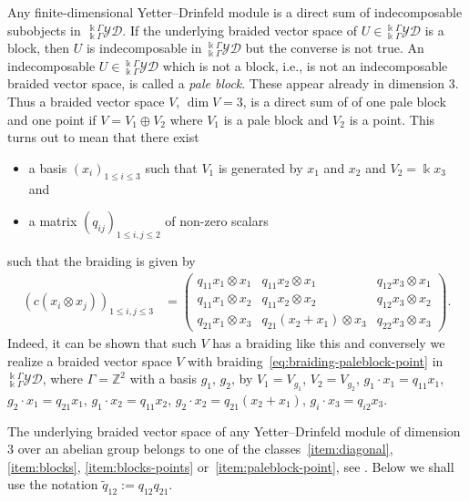 \documentclass[10pt,a4paper]{amsart}
\numberwithin{equation}{section}
\newcommand{\Z}{{\mathbb Z}}
\newcommand{\yd}[1]{{}_{#1}^{#1}\mathcal{YD}}
\begin{document}
Any finite-dimensional Yetter--Drinfeld module is a direct sum of indecomposable subobjects in~$\yd{\Bbbk\Gamma}$.
If the underlying braided vector space of $U\in\yd{\Bbbk\Gamma}$ is a block, then $U$ is indecomposable in $\yd{\Bbbk\Gamma}$ but the converse is not true. An indecomposable $U\in\yd{\Bbbk\Gamma}$ which is not a block, i.e., is not an indecomposable braided vector space, is called a \emph{pale block}. These appear already in dimension 3.
Thus a braided vector space $V$, $\dim V = 3$, is a direct sum of of one pale block and one point if
$V = V_1 \oplus V_2$ where $V_1$ is a pale block and $V_2 $ is a point. This turns out to mean that there exist
\begin{itemize}%
\itemsep=0pt
\item a basis $(x_i)_{1\le i \le 3}$ such that $V_1$ is generated by $x_1$ and $x_2$ and $V_2 = \Bbbk x_3$ and
\item a matrix $(q_{ij})_{1 \le i,j \le 2}$ of non-zero scalars
\end{itemize}
such that the braiding is given by
\begin{align}\label{eq:braiding-paleblock-point}
(c(x_i \otimes x_j))_{1 \le i,j \le 3} &=
\begin{pmatrix}
q_{11} x_1 \otimes x_1& q_{11} x_2 \otimes x_1& q_{12} x_3 \otimes x_1
\\
q_{11} x_1 \otimes x_2 & q_{11} x_2 \otimes x_2& q_{12} x_3 \otimes x_2
\\
q_{21} x_1 \otimes x_3 & q_{21}(x_2 + x_1) \otimes x_3& q_{22} x_3 \otimes x_3
\end{pmatrix}\!.
\end{align}
Indeed, it can be shown that such $V$ has a braiding like this \cite[Sections~4.1 and~8.1]{AAH-triang} and conversely
we realize a braided vector space $V$ with braiding~\eqref{eq:braiding-paleblock-point}
in $\yd{\Bbbk\Gamma}$, where $\Gamma = \Z^2$ with a basis $g_1$, $g_2$,
by $V_1 = V_{g_1}$, $V_2 = V_{g_2}$, $g_1\cdot x_1 = q_{11} x_1$, $g_2\cdot x_1 = q_{21} x_1$,
$g_1\cdot x_2 = q_{11} x_2$, $g_2\cdot x_2 = q_{21} (x_2 + x_1)$, $g_i\cdot x_3 = q_{i2} x_3$.

The underlying braided vector space of any Yetter--Drinfeld module of dimension 3 over an abelian group
belongs to one of the classes~\ref{item:diagonal}, \ref{item:blocks}, \ref{item:blocks-points} or~\ref{item:paleblock-point},
see \cite[Sections~4.1 and 8.1]{AAH-triang}. Below we shall use the notation $\widetilde{q}_{12} := q_{12}q_{21}$.
\end{document}
